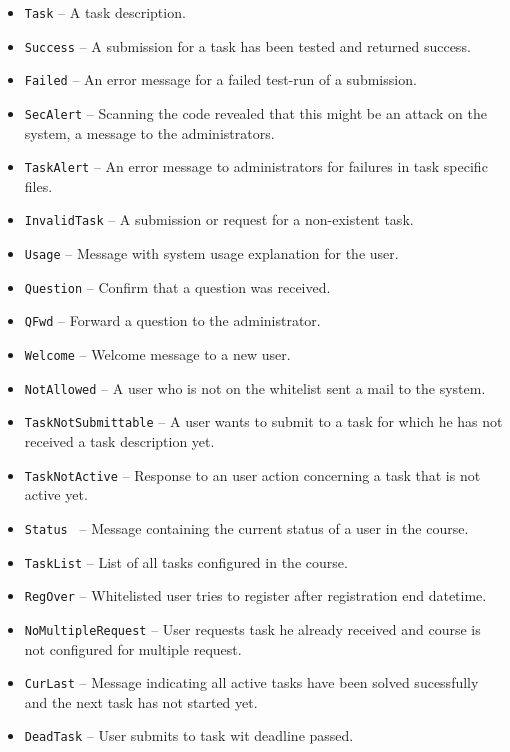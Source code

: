 \begin{description}
\begin{itemize}
            \begin{itemize}
                \item {\tt Task} -- A task description.
                \item {\tt Success} -- A submission for a task has been tested and returned success.
                \item {\tt Failed} -- An error message for a failed test-run of a submission.
                \item {\tt SecAlert} -- Scanning the code revealed that this might be an
                    attack on the system, a message to the administrators.
                \item {\tt TaskAlert} -- An error message to administrators for failures in task specific files.
                \item {\tt InvalidTask} -- A submission or request for a non-existent task.
                \item {\tt Usage} -- Message with system usage explanation for the user.
                \item {\tt Question} -- Confirm that a question was received.
                \item {\tt QFwd} -- Forward a question to the administrator.
                \item {\tt Welcome} -- Welcome message to a new user.
                \item {\tt NotAllowed} -- A user who is not on the whitelist sent a mail
                    to the system.
                \item {\tt TaskNotSubmittable} -- A user wants to submit to a task for which
                    he has not received a task description yet.
                \item {\tt TaskNotActive} -- Response to an user action concerning a task that is not active
                    yet.
                \item {\tt Status } -- Message containing the current status of a user in the course.
                \item {\tt TaskList} -- List of all tasks configured in the course.
                \item {\tt RegOver} -- Whitelisted user tries to register after registration end datetime.
                \item {\tt NoMultipleRequest} -- User requests task he already received and course is not
                    configured for multiple request.
                \item {\tt CurLast} -- Message indicating all active tasks have been solved sucessfully and the
                    next task has not started yet.
                \item {\tt DeadTask} -- User submits to task wit deadline passed.


\end{itemize}
\end{itemize}
\end{description}
